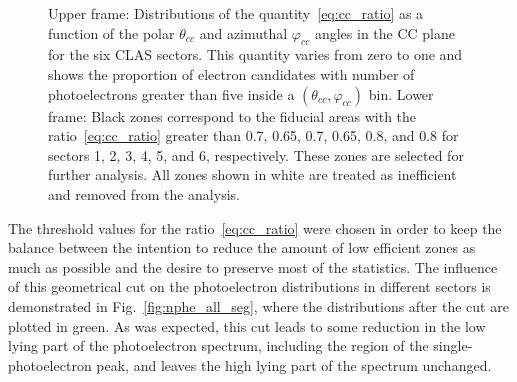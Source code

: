 \begin{figure}[htp]
\begin{center}
\caption{\small Upper frame: Distributions of the quantity~\eqref{eq:cc_ratio} as a function of the polar $\theta_{cc}$ and azimuthal $\varphi_{cc}$ angles in the CC plane for the six CLAS sectors. This quantity varies from zero to one and shows the proportion of electron candidates with number of photoelectrons greater than five inside a $(\theta_{cc},\varphi_{cc})$ bin. Lower frame: Black zones correspond to the fiducial areas with the ratio~\eqref{eq:cc_ratio} greater than 0.7, 0.65, 0.7, 0.65, 0.8, and 0.8 for sectors 1, 2, 3, 4, 5, and 6, respectively. These zones are selected for further analysis. All zones shown in white are treated as inefficient and removed from the analysis.} \label{fig:ph_vs_th_cc}
\end{center}
\end{figure}

The threshold values for the ratio~\eqref{eq:cc_ratio} were chosen in order to keep the balance between the intention to reduce the amount of low efficient zones as much as possible and the desire to preserve most of the statistics. The influence of this geometrical cut on the photoelectron distributions in different sectors is demonstrated in Fig.~\ref{fig:nphe_all_seg}, where the distributions after the cut are plotted in green. As was expected, this cut leads to some reduction in the low lying part of the photoelectron spectrum, including the region of the single-photoelectron peak, and leaves the high lying part of the spectrum unchanged.


